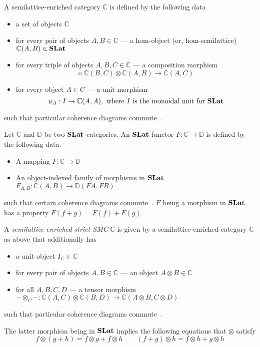 \begin{definition}
    A semilattice-enriched category $\mathbb{C}$ is defined by the following data
    \begin{itemize}
        \item a set of objects $\mathbb{C}$
        \item for every pair of objects $A,B \in \mathbb{C}$ --- a hom-object (or, hom-semilattice) $\mathbb{C}(A,B) \in \mathbf{SLat}$
        \item for every triple of objects $A,B,C \in \mathbb{C}$ --- a composition morphism
        \[
            \circ: \mathbb{C}(B,C) \otimes \mathbb{C}(A,B) \to \mathbb{C}(A,C)
        \]
        \item for every object $A \in C$ --- a unit morphism
        \[
        u_{A} : I \to \mathbb{C}(A,A), \text{ where $I$ is the monoidal unit for $\mathbf{SLat}$}
        \]
    \end{itemize}
    such that particular coherence diagrams commute~\cite{Borceux_1994}.
\end{definition}

\begin{definition}
	Let $\mathbb{C}$ and $\mathbb{D}$ be two $\mathbf{SLat}$-categories.
	An $\mathbf{SLat}$-functor $F : \mathbb{C} \to \mathbb{D}$ is defined by the following data.
	\begin{itemize}
	  \item A mapping $F : \mathbb{C} \to \mathbb{D}$
	  \item An object-indexed family of morphisms in $\mathbf{SLat}$ $F_{A,B} : \mathbb{C}(A,B) \to \mathbb{D}(FA,FB)$
	\end{itemize}
	such that certain coherence diagrams commute~\cite{Borceux_1994}.
	$F$ being a morphism in $\mathbf{SLat}$ has a property $F(f + g) = F(f) + F(g)$.
\end{definition}


\begin{definition}\label{def:enriched-prop}
    A \textit{semilattice enriched strict SMC}  $\mathbb{C}$ is given by a semilattice-enriched category $\mathbb{C}$ as above that additionally has
    \begin{itemize}
    \item a unit object $I_{C} \in \mathbb{C}$
    \item for every pair of objects $A,B \in \mathbb{C}$ --- an object $A \otimes B \in \mathbb{C}$
    \item for all $A,B,C,D$ --- a tensor morphism $ - \otimes_{C} - : \mathbb{C}(A,C) \otimes \mathbb{C}(B,D) \to \mathbb{C}(A \otimes B, C \otimes D)$
    \end{itemize}
    such that particular coherence diagrams commute~\cite{enriched_monoidal}.
    \end{definition}
    The latter morphism being in $\mathbf{SLat}$ implies the following equations that $\otimes$ satisfy
    \[
    f \otimes (g+h) = f \otimes g + f \otimes h \qquad (f+g) \otimes h = f \otimes h + g \otimes h
    \]
    
